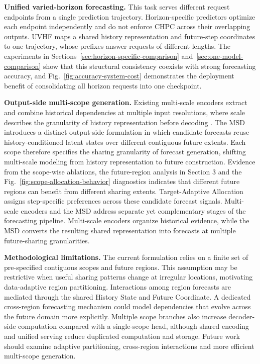 \documentclass[final,3p,times]{elsarticle}
\begin{document}
\textbf{Unified varied-horizon forecasting.} This task serves different request endpoints from a single prediction trajectory. Horizon-specific predictors optimize each endpoint independently and do not enforce CHPC across their overlapping outputs. UVHF maps a shared history representation and future-step coordinates to one trajectory, whose prefixes answer requests of different lengths. The experiments in Sections~\ref{sec:horizon-specific-comparison} and~\ref{sec:one-model-comparison} show that this structural consistency coexists with strong forecasting accuracy, and Fig.~\ref{fig:accuracy-system-cost} demonstrates the deployment benefit of consolidating all horizon requests into one checkpoint.

\textbf{Output-side multi-scope generation.} Existing multi-scale encoders extract and combine historical dependencies at multiple input resolutions, where scale describes the granularity of history representation before decoding \citep{challu2023nhits,chen2024pathformer,wang2024timemixer}. The MSD introduces a distinct output-side formulation in which candidate forecasts reuse history-conditioned latent states over different contiguous future extents. Each scope therefore specifies the sharing granularity of forecast generation, shifting multi-scale modeling from history representation to future construction. Evidence from the scope-wise ablations, the future-region analysis in Section 3 and the Fig.~\ref{fig:scope-allocation-behavior} diagnostics indicates that different future regions can benefit from different sharing extents. Target-Adaptive Allocation assigns step-specific preferences across these candidate forecast signals. Multi-scale encoders and the MSD address separate yet complementary stages of the forecasting pipeline. Multi-scale encoders organize historical evidence, while the MSD converts the resulting shared representation into forecasts at multiple future-sharing granularities.

\textbf{Methodological limitations.} The current formulation relies on a finite set of pre-specified contiguous scopes and future regions. This assumption may be restrictive when useful sharing patterns change at irregular locations, motivating data-adaptive region partitioning. Interactions among region forecasts are mediated through the shared History State and Future Coordinate. A dedicated cross-region forecasting mechanism could model dependencies that evolve across the future domain more explicitly. Multiple scope branches also increase decoder-side computation compared with a single-scope head, although shared encoding and unified serving reduce duplicated computation and storage. Future work should examine adaptive partitioning, cross-region interactions and more efficient multi-scope generation.
\end{document}
